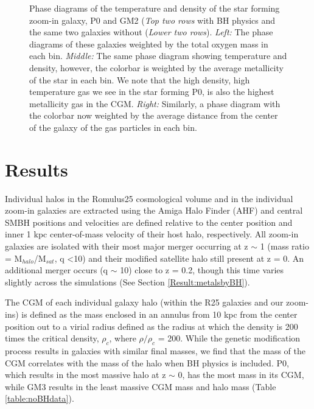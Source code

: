 \documentclass[]{emulateapj}
\begin{document}
\begin{figure}[p!]
\caption[]{Phase diagrams of the temperature and density of the star forming zoom-in galaxy, P0 and GM2 (\textit{Top two rows} with BH physics and the same two galaxies without (\textit{Lower two rows}). \textit{Left:} The phase diagrams of these galaxies weighted by the total oxygen mass in each bin. \textit{Middle:} The same phase diagram showing temperature and density, however, the colorbar is weighted by the average metallicity of the star in each bin. We note that the high density, high temperature gas we see in the star forming P0, is also the highest metallicity gas in the CGM. \textit{Right:} Similarly, a phase diagram with the colorbar now weighted by the average distance from the center of the galaxy of the gas particles in each bin.}
\label{figure:phasediagrams_z_R}
\end{figure}

\section{Results}\label{sec-results}
Individual halos in the {\sc Romulus25} cosmological volume and in the individual zoom-in galaxies are extracted using the Amiga Halo Finder (AHF) \citep{Knollmann2009} and central SMBH positions and velocities are defined relative to the center position and inner 1 kpc center-of-mass velocity of their host halo, respectively. All zoom-in galaxies are isolated with their most major merger occurring at z $\sim$ 1 (mass ratio = M$_{halo}$/M$_{sat}$, q \textless 10) and their modified satellite halo still present at z = 0. An additional merger occurs (q $\sim$ 10) close to z = 0.2, though this time varies slightly across the simulations (See Section \ref{Result:metalsbyBH}).

The CGM of each individual galaxy halo (within the R25 galaxies and our zoom-ins) is defined as the mass enclosed in an annulus from 10 kpc from the center position out to a virial radius defined as the radius at which the density is 200 times the critical density, $\rho_c$, where $\rho/\rho_c$ = 200. While the genetic modification process results in galaxies with similar final masses, we find that the mass of the CGM correlates with the mass of the halo when BH physics is included. P0, which results in the most massive halo at z $\sim$ 0, has the most mass in its CGM, while GM3 results in the least massive CGM mass and halo mass (Table \ref{table:noBHdata}).
\end{document}
